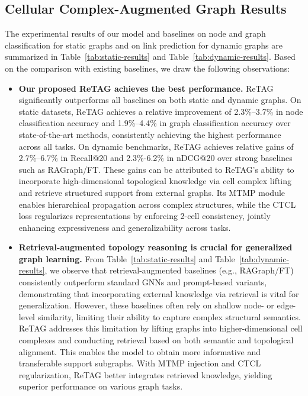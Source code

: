 \subsection{Cellular Complex-Augmented Graph Results}
The experimental results of our model and baselines on node and graph classification for static graphs and on link prediction for dynamic graphs are summarized in Table~\ref{tab:static-results} and Table~\ref{tab:dynamic-results}. Based on the comparison with existing baselines, we draw the following observations:
\setlength{\leftmargini}{0.5em}
\begin{itemize}
   \item \textbf{Our proposed ReTAG achieves the best performance.} 
ReTAG significantly outperforms all baselines on both static and dynamic graphs. 
On static datasets, ReTAG achieves a relative improvement of 2.3\%–3.7\% in node classification accuracy and 1.9\%–4.4\% in graph classification accuracy over state-of-the-art methods, consistently achieving the highest performance across all tasks. 
On dynamic benchmarks, ReTAG achieves relative gains of 2.7\%–6.7\% in Recall@20 and 2.3\%-6.2\% in nDCG@20 over strong baselines such as RAGraph/FT.
These gains can be attributed to ReTAG's ability to incorporate high-dimensional topological knowledge via cell complex lifting and retrieve structured support from external graphs. 
Its MTMP module enables hierarchical propagation across complex structures, while the CTCL loss regularizes representations by enforcing 2-cell consistency, jointly enhancing expressiveness and generalizability across tasks.



    \item \textbf{Retrieval-augmented topology reasoning is crucial for generalized graph learning.} 
From Table~\ref{tab:static-results} and Table~\ref{tab:dynamic-results}, we observe that retrieval-augmented baselines (e.g., RAGraph/FT) consistently outperform standard GNNs and prompt-based variants, demonstrating that incorporating external knowledge via retrieval is vital for generalization. 
However, these baselines often rely on shallow node- or edge-level similarity, limiting their ability to capture complex structural semantics. 
ReTAG addresses this limitation by lifting graphs into higher-dimensional cell complexes and conducting retrieval based on both semantic and topological alignment. 
This enables the model to obtain more informative and transferable support subgraphs. 
With MTMP injection and CTCL regularization, ReTAG better integrates retrieved knowledge, yielding superior performance on various graph tasks.



\end{itemize}
